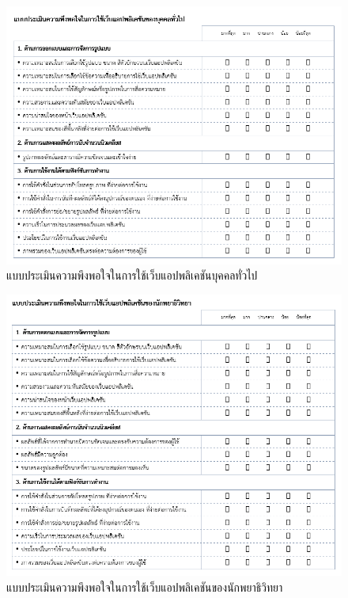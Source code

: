 \documentclass[12pt,oneside,openright,a4paper]{cpe-thai-project}
\begin{document}
\begin{figure}[!h]\centering
\includegraphics[width=14cm]{images/questionnairepeople.png}
\captionsetup{justification=centering}
\caption{แบบประเมินความพึงพอใจในการใช้เว็บแอปพลิเคชันบุคคลทั่วไป}\label{fig:quationirepeople}
\end{figure}

\begin{figure}[!h]\centering
\includegraphics[width=14cm]{images/questionnairepatho.png}
\captionsetup{justification=centering}
\caption{แบบประเมินความพึงพอใจในการใช้เว็บแอปพลิเคชันของนักพยาธิวิทยา}\label{fig:quationirepatho}
\vspace{128in}
\end{figure}
\end{document}
